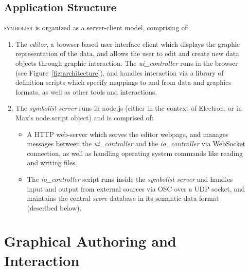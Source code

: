 \documentclass{article}
\def\symbolist{\textsc{symbolist}\xspace}
\def\uicontroller{\textit{ui\_controller}\xspace}
\def\iocontroller{\textit{io\_controller}\xspace}
\begin{document}
\subsection{Application Structure}\label{sec:application_structure}

\symbolist is organized as a server-client model, comprising of:

\begin{enumerate}\itemsep0pt 
\item The \textit{editor}, a browser-based user interface client which displays the graphic representation of the data, and allows the user to edit and create new data objects through graphic interaction. The \uicontroller runs in the browser (see Figure~\ref{fig:architecture}), and handles interaction via a library of definition scripts which specify mappings to and from data and graphics formats, as well as other tools and interactions.

\item The \textit{symbolist server} runs in node.js (either in the context of Electron, or in Max's node.script object) and is comprised of: 
\begin{itemize}\itemsep0pt 

\item A HTTP web-server which serves the editor webpage, and manages messages between the \uicontroller and the \iocontroller via WebSocket connection, as well as handling operating system commands like reading and writing files.

\item  The \iocontroller script runs inside the \textit{symbolist server} and handles input and output from external sources via OSC over a UDP socket, and maintains the central \textit{score} database in its semantic data format (described below).
\end{itemize}
\end{enumerate}

%
%

\section{Graphical Authoring and Interaction}\label{sec:editor} %
\end{document}

